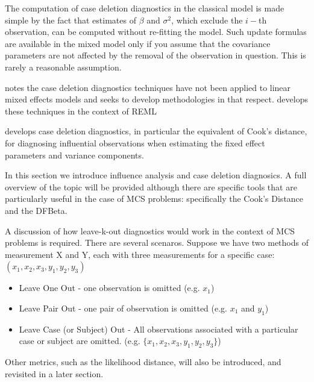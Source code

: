 \documentclass[12pt, a4paper]{report}
\theoremstyle{plain}
\theoremstyle{definition}
\theoremstyle{remark}
\begin{document}
The computation of case deletion diagnostics in the classical model is made simple by the fact that estimates of $\beta$ and $\sigma^2$, which exclude the $i-$th observation, can be computed without re-fitting the model. Such update formulas are available in the mixed model only if you assume that the covariance parameters are not affected by the removal of the observation in question. This is rarely a reasonable assumption.

\citet{Christiansen} notes the case deletion diagnostics techniques have not been applied to linear mixed effects models and seeks to develop methodologies in that respect. \citet{Christiansen} develops these techniques in the context of REML

\citet{Christiansen} develops  case deletion diagnostics, in particular the equivalent of  Cook's distance, for diagnosing influential observations when estimating the fixed effect parameters and variance components.

In this section we introduce influence analysis and case deletion diagnosics. A full overview of the topic will be provided although there are specific tools that are particularly useful in the case of MCS problems: specifically the Cook's Distance and the DFBeta.

A discussion of how leave-k-out diagnostics would work in the context of MCS problems is required. There are several scenaros. Suppose we have two methods of measurement X and Y, each with three measurements for a specific case: $(x_1,x_2,x_3,y_1,y_2,y_3)$

\begin{itemize}
	\item Leave One Out - one observation is omitted (e.g. $x_1$)
	\item Leave Pair Out - one pair of observation  is omitted (e.g. $x_1$ and $y_1$)
	\item Leave Case (or Subject) Out - All observations associated with a particular case or subject are omitted. (e.g. $\{x_1,x_2,x_3,y_1,y_2,y_3\}$)
\end{itemize}
Other metrics, such as the likelihood distance, will also be introduced, and revisited in a later section.

\end{document}
